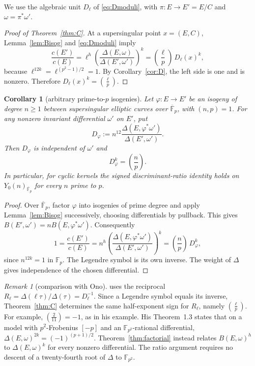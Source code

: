 \documentclass[11pt,a4paper]{article}
\numberwithin{equation}{section}
\newtheorem{corollary}[theorem]{Corollary}
\theoremstyle{definition}
\theoremstyle{remark}
\newtheorem{remark}[theorem]{Remark}
\newcommand{\Fp}{\mathbb F_p}
\newcommand{\Fq}{\mathbb F_{p^2}}
\newcommand{\Fb}{\overline{\mathbb F}_p}
\newcommand{\leg}[2]{\left(\frac{#1}{#2}\right)}
\newcommand{\Lp}[1]{\left(\frac{#1}{p}\right)}
\begin{document}
We use the algebraic unit $D_\ell$ of \eqref{eq:Dmoduli}, with
$\pi:E\to E'=E/C$ and $\omega=\pi^*\omega'$.

\begin{proof}[Proof of Theorem~\ref{thm:C}]
At a supersingular point $x=(E,C)$, Lemma~\ref{lem:Bisog} and
\eqref{eq:Dmoduli} imply
\[
\frac{c(E')}{c(E)}
=\ell^h\left(\frac{\Delta(E,\omega)}{\Delta(E',\omega')}\right)^k
=\Lp\ell\,D_\ell(x)^k,
\]
because $\ell^{12k}=\ell^{(p^2-1)/2}=1$.
By Corollary~\ref{cor:D}, the left side is one and is nonzero.
Therefore $D_\ell(x)^k=\Lp\ell$.
\end{proof}

\begin{corollary}[arbitrary prime-to-$p$ isogenies]\label{cor:degree-n}
Let $\varphi:E\to E'$ be an isogeny of degree $n\ge1$ between
supersingular elliptic curves over $\Fb$, with $(n,p)=1$. For any
nonzero invariant differential $\omega'$ on $E'$, put
\[
D_\varphi:=n^{12}
\frac{\Delta(E,\varphi^*\omega')}{\Delta(E',\omega')}.
\]
Then $D_\varphi$ is independent of $\omega'$ and
\[
D_\varphi^k=\Lp n.
\]
In particular, for cyclic kernels the signed discriminant-ratio
identity holds on $Y_0(n)_{\Fb}$ for every $n$ prime to $p$.
\end{corollary}
\begin{proof}
Over $\Fb$, factor $\varphi$ into isogenies of prime degree and apply
Lemma~\ref{lem:Bisog} successively, choosing differentials by pullback.
This gives $B(E',\omega')=nB(E,\varphi^*\omega')$. Consequently
\[
1=\frac{c(E')}{c(E)}
=n^h\left(\frac{\Delta(E,\varphi^*\omega')}{\Delta(E',\omega')}\right)^k
=\Lp n\,D_\varphi^k,
\]
since $n^{12k}=1$ in $\Fp$. The Legendre symbol is its own inverse.
The weight of $\Delta$ gives independence of the chosen differential.
\end{proof}

\begin{remark}[comparison with Ono]\label{rem:ono}
\citet[Theorem~1.2 and Remark~4]{Ono25} uses the reciprocal
$R_\ell=\Delta(\ell\tau)/\Delta(\tau)=D_\ell^{-1}$.
Since a Legendre symbol equals its inverse, Theorem~\ref{thm:C}
determines the same half-exponent sign for $R_\ell$, namely $\Lp\ell$.
For example, $\leg2{11}=-1$, as in his example.
His Theorem~1.3 states that on a model with $p^2$-Frobenius $[-p]$
and an $\Fq$-rational differential,
$\Delta(E,\omega)^{2k}=(-1)^{(p+1)/2}$.
Theorem~\ref{thm:factorial} instead relates $B(E,\omega)^h$ to
$\Delta(E,\omega)^k$ for every nonzero differential.
The ratio argument requires no descent of a twenty-fourth root of
$\Delta$ to $\Fq$.
\end{remark}
\end{document}
